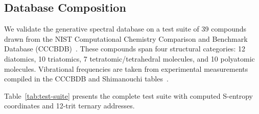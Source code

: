 \documentclass[11pt,twocolumn,a4paper]{article}
\theoremstyle{definition}
\theoremstyle{remark}
\begin{document}
\subsection{Database Composition}
\label{sec:database-composition}

We validate the generative spectral database on a test suite of 39 compounds drawn from the NIST Computational Chemistry Comparison and Benchmark Database (CCCBDB)~\citep{johnson2022}. These compounds span four structural categories: 12 diatomics, 10 triatomics, 7 tetratomic/tetrahedral molecules, and 10 polyatomic molecules. Vibrational frequencies are taken from experimental measurements compiled in the CCCBDB and Shimanouchi tables~\citep{shimanouchi1972}.

Table~\ref{tab:test-suite} presents the complete test suite with computed S-entropy coordinates and 12-trit ternary addresses.
\end{document}
